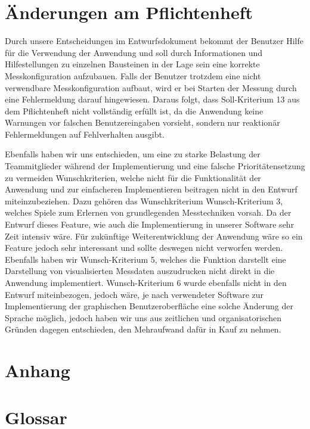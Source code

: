 \documentclass[parskip=full]{scrartcl}
\begin{document}
\clearpage
\section{Änderungen am Pflichtenheft}

Durch unsere Entscheidungen im Entwurfsdokument bekommt der Benutzer Hilfe für die Verwendung der Anwendung und soll durch Informationen und Hilfestellungen zu einzelnen Bausteinen in der Lage sein eine korrekte Messkonfiguration aufzubauen.
Falls der Benutzer trotzdem eine nicht verwendbare Messkonfiguration aufbaut, wird er bei Starten der Messung durch eine Fehlermeldung darauf hingewiesen.
Daraus folgt, dass Soll-Kriterium 13 aus dem Pflichtenheft nicht vollständig erfüllt ist, da die Anwendung keine Warnungen vor falschen Benutzereingaben vorsieht, sondern nur reaktionär Fehlermeldungen auf Fehlverhalten ausgibt.

Ebenfalls haben wir uns entschieden, um eine zu starke Belastung der Teammitglieder während der Implementierung und eine falsche Prioritätensetzung zu vermeiden Wunschkriterien, welche nicht für die Funktionalität der Anwendung und zur einfacheren Implementieren beitragen nicht in den Entwurf miteinzubeziehen. 
Dazu gehören das Wunschkriterium Wunsch-Kriterium 3, welches Spiele zum Erlernen von grundlegenden Messtechniken vorsah. Da der Entwurf dieses Feature, wie auch die Implementierung in unserer Software sehr Zeit intensiv wäre. Für zukünftige Weiterentwicklung der Anwendung wäre so ein Feature jedoch sehr interessant und sollte deswegen nicht verworfen werden.
Ebenfalls haben wir Wunsch-Kriterium 5, welches die Funktion darstellt eine Darstellung von visualisierten Messdaten auszudrucken nicht direkt in die Anwendung implementiert. 
Wunsch-Kriterium 6 wurde ebenfalls nicht in den Entwurf miteinbezogen, jedoch wäre, je nach verwendeter Software zur Implementierung der graphischen Benutzeroberfläche eine solche Änderung der Sprache möglich, jedoch haben wir uns aus zeitlichen und organisatorischen Gründen dagegen entschieden, den Mehraufwand dafür in Kauf zu nehmen.

\section{Anhang}



\clearpage
\section{Glossar}\label{glossar}

\renewcommand*{\glossarysection}[2][]{}	%
\printnoidxglossaries				%
\end{document}
